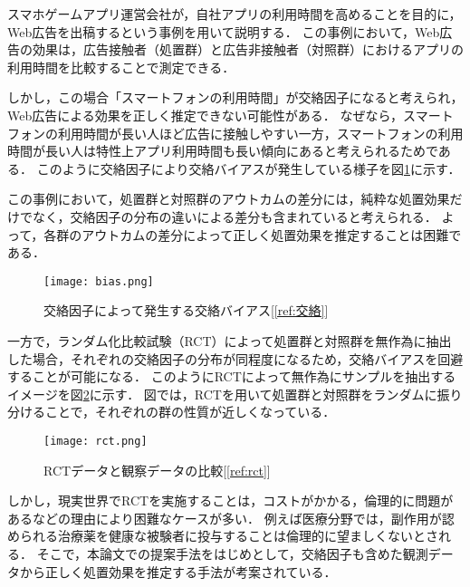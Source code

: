 \documentclass[dvipdfmx]{jreport}
\begin{document}
スマホゲームアプリ運営会社が，自社アプリの利用時間を高めることを目的に，Web広告を出稿するという事例を用いて説明する．
この事例において，Web広告の効果は，広告接触者（処置群）と広告非接触者（対照群）におけるアプリの利用時間を比較することで測定できる．

しかし，この場合「スマートフォンの利用時間」が交絡因子になると考えられ，Web広告による効果を正しく推定できない可能性がある．
なぜなら，スマートフォンの利用時間が長い人ほど広告に接触しやすい一方，スマートフォンの利用時間が長い人は特性上アプリ利用時間も長い傾向にあると考えられるためである．
このように交絡因子により交絡バイアスが発生している様子を図\ref{fig:bias}に示す．

この事例において，処置群と対照群のアウトカムの差分には，純粋な処置効果だけでなく，交絡因子の分布の違いによる差分も含まれていると考えられる．
よって，各群のアウトカムの差分によって正しく処置効果を推定することは困難である．
\begin{figure}[h]
    \begin{center}
        \texttt{[image: bias.png]}
        \caption{交絡因子によって発生する交絡バイアス[\ref{ref:交絡}]} \label{fig:bias}
    \end{center}
\end{figure}

\newpage
一方で，ランダム化比較試験（RCT）によって処置群と対照群を無作為に抽出した場合，それぞれの交絡因子の分布が同程度になるため，交絡バイアスを回避することが可能になる．
このようにRCTによって無作為にサンプルを抽出するイメージを図\ref{fig:rct}に示す．
図では，RCTを用いて処置群と対照群をランダムに振り分けることで，それぞれの群の性質が近しくなっている．
\begin{figure}[h]
    \begin{center}
        \texttt{[image: rct.png]} 
        \caption{RCTデータと観察データの比較[\ref{ref:rct}]} \label{fig:rct}
    \end{center}
\end{figure}

しかし，現実世界でRCTを実施することは，コストがかかる，倫理的に問題があるなどの理由により困難なケースが多い．
例えば医療分野では，副作用が認められる治療薬を健康な被験者に投与することは倫理的に望ましくないとされる．
そこで，本論文での提案手法をはじめとして，交絡因子も含めた観測データから正しく処置効果を推定する手法が考案されている．
\end{document}
